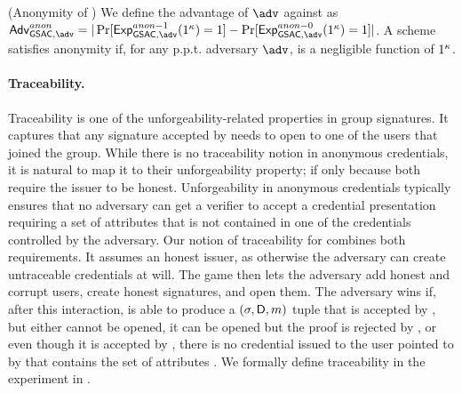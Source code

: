 \begin{definition}{(Anonymity of \GSAC)}
  We define the advantage \AdvGSACAnon of $\adv$ against \ExpGSACAnonb as
  $\AdvGSACAnon=|\Pr\lbrack\ExpGSACAnono(1^\secpar)=1\rbrack-
  \Pr\lbrack\ExpGSACAnonz(1^\secpar)=1\rbrack|$.
  A \GSAC scheme satisfies anonymity if, for any p.p.t. adversary $\adv$,
  \AdvAnon is a negligible function of $1^\kappa$.
\end{definition}

\paragraph{Traceability.} %
Traceability is one of the unforgeability-related properties in group
signatures. It captures that any signature accepted by \Verify needs to open
to one of the users that joined the group. While there is no traceability notion
in anonymous credentials, it is natural to map it to their unforgeability
property; if only because both require the issuer to be honest. Unforgeability
in anonymous credentials typically ensures that no adversary can get a verifier
to accept a credential presentation requiring a set of attributes that is not
contained in one of the credentials controlled by the adversary.
%
Our notion of traceability for \GSAC combines both requirements. It assumes an
honest issuer, as otherwise the adversary can create untraceable credentials at
will. The game then lets the adversary add honest and corrupt users, create
honest signatures, and open them. The adversary wins if, after this interaction,
is able to produce a $(\sigma,\mathsf{D},m)$ tuple that is accepted by \Verify,
but either cannot be opened, it can be opened but the proof is rejected by
\Judge, or even though it is accepted by \Judge, there is no credential issued
to the user pointed to by \Open that contains the set of attributes \DAttrs. We
formally define traceability in the \ExpTrace experiment in
.

